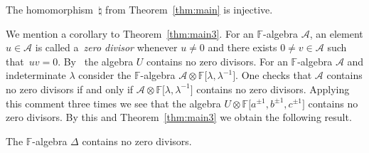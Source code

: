\begin{Theorem}
\label{thm:main3}
The
homomorphism~$\natural$
from Theorem~{\rm \ref{thm:main}} is injective.
\end{Theorem}


We mention a corollary to
Theorem~\ref{thm:main3}.
For an $\mathbb F$-algebra $\mathcal A$,
an element $u \in {\mathcal A}$ is called a~{\it zero divisor}
whenever $u\not=0$ and
there exists $0 \not=v \in \mathcal A$
such that~$uv=0$.
By~\cite[Proposition~1.8]{jantzen}
the
algebra $U$
contains no zero divisors.
For an $\mathbb F$-algebra $\mathcal A$
and indeterminate $\lambda$ consider the $\mathbb F$-algebra
${\mathcal A}\otimes \mathbb F \lbrack \lambda,\lambda^{-1}\rbrack$.
One checks that
$\mathcal A$ contains no zero divisors if and only if
${\mathcal A}\otimes \mathbb F \lbrack \lambda,\lambda^{-1}\rbrack$
contains no zero divisors.
Applying this comment three times we see that
the algebra
$
U \otimes
\mathbb F \lbrack a^{\pm 1}, b^{\pm 1}, c^{\pm 1}\rbrack
$ contains no zero divisors.
By this and
Theorem~\ref{thm:main3} we obtain the following result.

\begin{Corollary}
\label{cor:nozerodiv}
The $\mathbb F$-algebra $\Delta$ contains no zero divisors.
\end{Corollary}

